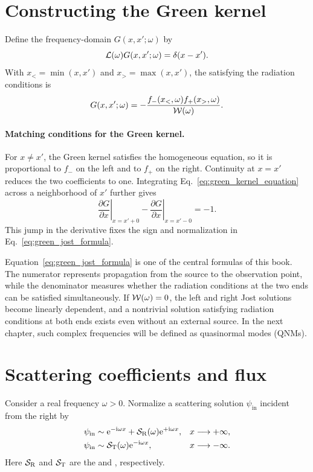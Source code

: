 \section{Constructing the Green kernel}

Define the frequency-domain  $G(x,x';\omega)$ by
\begin{equation}
\mathcal{L}(\omega)G(x,x';\omega)
=
\delta(x-x').
\label{eq:green_kernel_equation}
\end{equation}
With $x_< =\min(x,x')$ and $x_>=\max(x,x')$, the  satisfying the radiation conditions is
\begin{equation}
G(x,x';\omega)
=
-\frac{
f_-(x_<,\omega)f_+(x_>,\omega)
}{
\mathcal{W}(\omega)
}.
\label{eq:green_jost_formula}
\end{equation}

\paragraph{Matching conditions for the Green kernel.}
For $x\ne x'$, the Green kernel satisfies the homogeneous equation, so it is proportional to $f_-$ on the left and to $f_+$ on the right. Continuity at $x=x'$ reduces the two coefficients to one. Integrating Eq.~\eqref{eq:green_kernel_equation} across a neighborhood of $x'$ further gives
\begin{equation}
\left.
\frac{\partial G}{\partial x}
\right|_{x=x'+0}
-
\left.
\frac{\partial G}{\partial x}
\right|_{x=x'-0}
=
-1.
\end{equation}
This jump in the derivative fixes the sign and normalization in Eq.~\eqref{eq:green_jost_formula}.

Equation~\eqref{eq:green_jost_formula} is one of the central formulas of this book. The numerator represents propagation from the source to the observation point, while the denominator measures whether the radiation conditions at the two ends can be satisfied simultaneously. If $\mathcal{W}(\omega)=0$, the left and right Jost solutions become linearly dependent, and a nontrivial solution satisfying radiation conditions at both ends exists even without an external source. In the next chapter, such complex frequencies will be defined as quasinormal modes (QNMs).

\section{Scattering coefficients and flux}

Consider a real frequency $\omega>0$. Normalize a scattering solution $\psi_{\mathrm{in}}$ incident from the right by
\begin{align}
\psi_{\mathrm{in}}
&\sim
\mathrm{e}^{-\mathrm{i}\omega x}
+\mathcal{S}_{\mathrm{R}}(\omega)
\mathrm{e}^{+\mathrm{i}\omega x},
&&x\longrightarrow+\infty,
\label{eq:scatter_right}
\\
\psi_{\mathrm{in}}
&\sim
\mathcal{S}_{\mathrm{T}}(\omega)
\mathrm{e}^{-\mathrm{i}\omega x},
&&x\longrightarrow-\infty.
\label{eq:scatter_left}
\end{align}
Here $\mathcal{S}_{\mathrm{R}}$ and $\mathcal{S}_{\mathrm{T}}$ are the  and , respectively.

